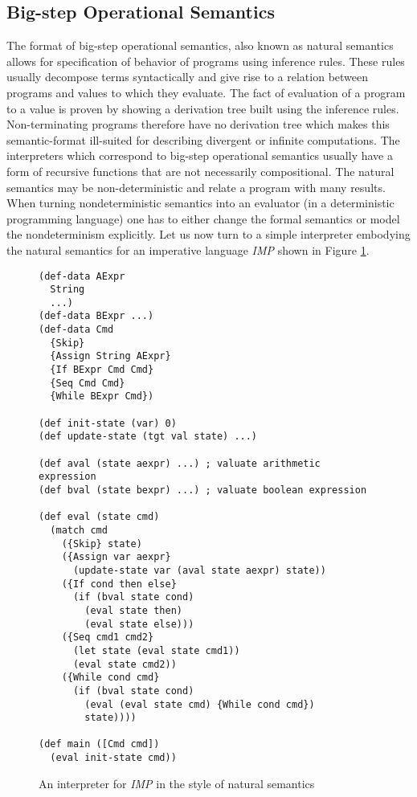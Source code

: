 \subsection*{Big-step Operational Semantics}
The format of big-step operational semantics, also known as natural semantics allows for specification of behavior of programs using inference rules.
These rules usually decompose terms syntactically and give rise to a relation between programs and values to which they evaluate.
The fact of evaluation of a program to a value is proven by showing a derivation tree built using the inference rules.
Non-terminating programs therefore have no derivation tree which makes this semantic-format ill-suited for describing divergent or infinite computations.
The interpreters which correspond to big-step operational semantics usually have a form of recursive functions that are not necessarily compositional.
The natural semantics may be non-deterministic and relate a program with many results.
When turning nondeterministic semantics into an evaluator (in a deterministic programming language) one has to either change the formal semantics or model the nondeterminism explicitly.
Let us now turn to a simple interpreter embodying the natural semantics for an imperative language \textit{IMP} shown in Figure \ref{fig:evaluator-imp}.

\begin{figure}\label{fig:evaluator-imp}
\begin{lstlisting}
(def-data AExpr
  String
  ...)
(def-data BExpr ...)
(def-data Cmd
  {Skip}
  {Assign String AExpr}
  {If BExpr Cmd Cmd}
  {Seq Cmd Cmd}
  {While BExpr Cmd})

(def init-state (var) 0)
(def update-state (tgt val state) ...)

(def aval (state aexpr) ...) ; valuate arithmetic expression
(def bval (state bexpr) ...) ; valuate boolean expression

(def eval (state cmd)
  (match cmd
    ({Skip} state)
    ({Assign var aexpr}
      (update-state var (aval state aexpr) state))
    ({If cond then else}
      (if (bval state cond)
        (eval state then)
        (eval state else)))
    ({Seq cmd1 cmd2}
      (let state (eval state cmd1))
      (eval state cmd2))
    ({While cond cmd}
      (if (bval state cond)
        (eval (eval state cmd) {While cond cmd})
        state))))

(def main ([Cmd cmd])
  (eval init-state cmd))
\end{lstlisting}
\caption{An interpreter for \textit{IMP} in the style of natural semantics}
\end{figure}

